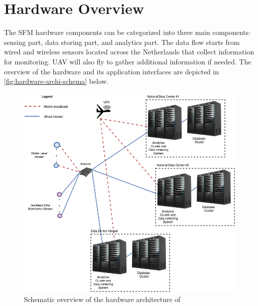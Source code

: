 \section{Hardware Overview}
\label{sec:hardware-overview}
The SFM hardware components can be categorized into three main components: sensing part, data storing part, and analytics part. The data flow starts from wired and wireless sensors located across the Netherlands that collect information for monitoring. UAV will also fly to gather additional information if needed. The overview of the hardware and its application interfaces are depicted in \autoref{fig:hardware-archi-schema} below.

\begin{figure}[hb!]
\centering
\includegraphics[scale=0.4]{6-hardware/images/hardwareoverview.png}
\caption{Schematic overview of the hardware architecture of \ProjectName{}}
\label{fig:hardware-archi-schema}
\end{figure}

